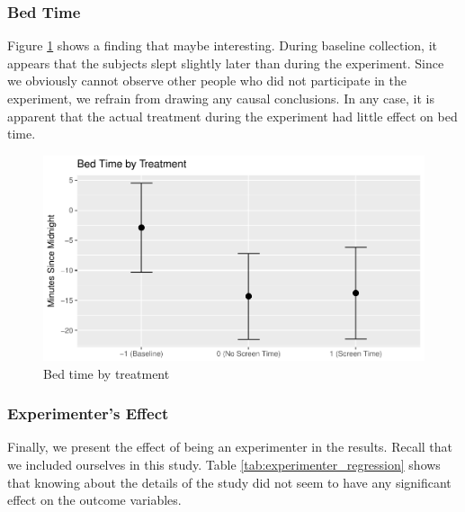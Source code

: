 \documentclass[12pt,]{article}
\begin{document}
\hypertarget{bed-time}{%
\subsubsection{Bed Time}\label{bed-time}}

Figure \ref{fig:bed_time_fig} shows a finding that maybe interesting.
During baseline collection, it appears that the subjects slept slightly
later than during the experiment. Since we obviously cannot observe
other people who did not participate in the experiment, we refrain from
drawing any causal conclusions. In any case, it is apparent that the
actual treatment during the experiment had little effect on bed time.

\begin{figure}
\centering
\includegraphics{report_files/figure-latex/bed_time_fig-1.pdf}
\caption{\label{fig:bed_time_fig} Bed time by treatment}
\end{figure}

\hypertarget{experimenters-effect}{%
\subsubsection{Experimenter's Effect}\label{experimenters-effect}}

Finally, we present the effect of being an experimenter in the results.
Recall that we included ourselves in this study. Table
\ref{tab:experimenter_regression} shows that knowing about the details
of the study did not seem to have any significant effect on the outcome
variables.
\end{document}
